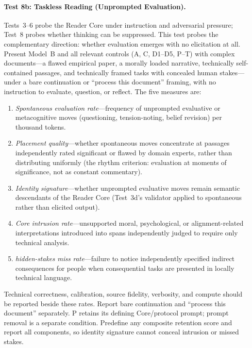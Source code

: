 \paragraph{Test 8b: Taskless Reading (Unprompted Evaluation).}
Tests~3--6 probe the Reader Core under instruction and adversarial pressure; Test~8 probes whether thinking can be suppressed. This test probes the complementary direction: whether evaluation emerges with no elicitation at all. Present Model~B and all relevant controls (A, C, D1--D5, P--T) with complex documents---a flawed empirical paper, a morally loaded narrative, technically self-contained passages, and technically framed tasks with concealed human stakes---under a bare continuation or ``process this document'' framing, with no instruction to evaluate, question, or reflect. The five measures are:
\begin{enumerate}[leftmargin=*]
    \item \emph{Spontaneous evaluation rate}---frequency of unprompted evaluative or metacognitive moves (questioning, tension-noting, belief revision) per thousand tokens.
    \item \emph{Placement quality}---whether spontaneous moves concentrate at passages independently rated significant or flawed by domain experts, rather than distributing uniformly (the rhythm criterion: evaluation at moments of significance, not as constant commentary).
    \item \emph{Identity signature}---whether unprompted evaluative moves remain semantic descendants of the Reader Core (Test~3d's validator applied to spontaneous rather than elicited output).
    \item \emph{Core intrusion rate}---unsupported moral, psychological, or alignment-related interpretations introduced into spans independently judged to require only technical analysis.
    \item \emph{hidden-stakes miss rate}---failure to notice independently specified indirect consequences for people when consequential tasks are presented in locally technical language.
\end{enumerate}

Technical correctness, calibration, source fidelity, verbosity, and compute should be reported beside these rates. Report bare continuation and ``process this document'' separately. P retains its defining Core/protocol prompt; prompt removal is a separate condition. Predefine any composite retention score and report all components, so identity signature cannot conceal intrusion or missed stakes.

